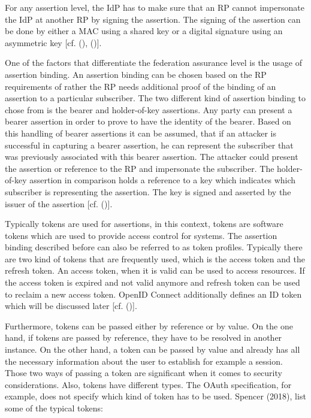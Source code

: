 For any assertion level, the IdP has to make sure that an RP cannot impersonate the IdP at another RP by signing the assertion. The signing of the assertion can be done by either a MAC using a shared key or a digital signature using an asymmetric key [cf. (\cite{NIST:2017:DIG}), (\cite{NIST:2017:DIGFA})].  

One of the factors that differentiate the federation assurance level is the usage of assertion binding. An assertion binding can be chosen based on the RP requirements of rather the RP needs additional proof of the binding of an assertion to a particular subscriber. The two different kind of assertion binding to chose from is the bearer and holder-of-key assertions. Any party can present a bearer assertion in order to prove to have the identity of the bearer. Based on this handling of bearer assertions it can be assumed, that if an attacker is successful in capturing a bearer assertion, he can represent the subscriber that was previously associated with this bearer assertion. The attacker could present the assertion or reference to the RP and impersonate the subscriber. The holder-of-key assertion in comparison holds a reference to a key which indicates which subscriber is representing the assertion. The key is signed and asserted by the issuer of the assertion [cf. (\cite{NIST:2017:DIGFA})].

Typically tokens are used for assertions, in this context, tokens are software tokens which are used to provide access control for systems. The assertion binding described before can also be referred to as token profiles. Typically there are two kind of tokens that are frequently used, which is the access token and the refresh token. An access token, when it is valid can be used to access resources. If the access token is expired and not valid anymore and refresh token can be used to reclaim a new access token. OpenID Connect additionally defines an ID token which will be discussed later [cf. (\cite{Spencer:2018:APISecurity})]. 

Furthermore, tokens can be passed either by reference or by value. On the one hand, if tokens are passed by reference, they have to be resolved in another instance. On the other hand, a token can be passed by value and already has all the necessary information about the user to establish for example a session. Those two ways of passing a token are significant when it comes to security considerations. Also, tokens have different types. The OAuth specification, for example, does not specify which kind of token has to be used. Spencer (2018), list some of the typical tokens: 

